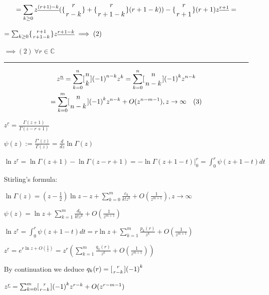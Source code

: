 \documentclass{article}
\begin{document}
\[ = \sum_{k \geq 0} z^{\underline{(r+1)-k}} (\{{{r} \atop {r-k}}\} + \{{{r} \atop {r+1-k}}\}(r+1-k)) - \{{{r} \atop {r+1}}\}(r+1)z^{\underline{r+1}} = \]

\( = \sum_{k \geq 0} \{{{r+1} \atop {r+1-k}}\} z^{\underline{r+1-k}} \implies (2) \)

\( \implies (2)\ \forall r \in \mathbb{C} \)

\bigskip\hrule\bigskip

\begin{multline*}
z^{\underline{n}} = \sum_{k=0}^{n} [{n \atop k}]{(-1)}^{n-k}z^{k} = \sum_{k=0}^{n} [{n \atop {n-k}}]{(-1)}^{k}z^{n-k} \\
= \sum_{k=0}^{m} [{n \atop {n-k}}]{(-1)}^{k}z^{n-k} + O(z^{n-m-1}), z \to \infty\quad(3)
\end{multline*}

\( z^{\underline{r}} = \frac{\Gamma(z+1)}{\Gamma(z-r+1)} \)

\( \psi(z) := \frac{\Gamma'(z)}{\Gamma(z)} = \frac{d}{dz} \ln \Gamma(z) \)

\( \ln z^{\underline{r}} = \ln \Gamma(z+1) - \ln \Gamma(z-r+1) = - \ln\Gamma(z+1-t) \Big|_{0}^{r} = \int_{0}^{r} \psi(z+1-t) dt \)

Stirling's formula:

\( \ln \Gamma(z) = (z-\frac{1}{2})\ln{z} - z + \sum_{k=0}^{m} \frac{c_{k}}{k! z^{k}} + O(\frac{1}{z^{m+1}}), z \to \infty \)

\( \psi(z) = \ln{z} + \sum_{k=1}^{m} \frac{d_{k}}{k! z^{k}} + O(\frac{1}{z^{m+1}}) \)

\( \ln z^{\underline{r}} = \int_{0}^{r} \psi(z+1-t)dt = r \ln z + \sum_{k=1}^{m} \frac{p_{k}(r)}{z^{k}} + O(\frac{1}{z^{m+1}}) \)

\( z^{\underline{r}} = e^{r \ln z + O(\frac{1}{z})} = z^{r} (\sum_{k=1}^{m} \frac{q_{k}(r)}{z^{k}} + O(\frac{1}{z^{m+1}})) \)

By continuation we deduce \( q_{k}(r) = [{r \atop {r-k}}]{(-1)}^{k} \)

\( z^{\underline{r}} = \sum_{k=0}^{m} [{r \atop {r-k}}]{(-1)}^{k} z^{r-k} + O(z^{r-m-1}) \)
\end{document}
